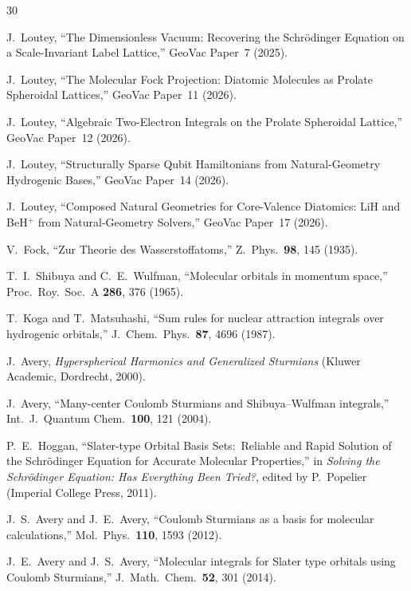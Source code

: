 \documentclass[aps,pra,twocolumn,superscriptaddress,longbibliography]{revtex4-2}
\begin{document}
\begin{thebibliography}{30}

J.~Loutey, ``The Dimensionless Vacuum: Recovering the Schr\"odinger
  Equation on a Scale-Invariant Label Lattice,'' GeoVac Paper~7 (2025).

J.~Loutey, ``The Molecular Fock Projection: Diatomic Molecules as
  Prolate Spheroidal Lattices,'' GeoVac Paper~11 (2026).

J.~Loutey, ``Algebraic Two-Electron Integrals on the Prolate
  Spheroidal Lattice,'' GeoVac Paper~12 (2026).

J.~Loutey, ``Structurally Sparse Qubit Hamiltonians from Natural-Geometry
  Hydrogenic Bases,'' GeoVac Paper~14 (2026).

J.~Loutey, ``Composed Natural Geometries for Core-Valence Diatomics:
  LiH and BeH$^+$ from Natural-Geometry Solvers,'' GeoVac Paper~17 (2026).

V.~Fock, ``Zur Theorie des Wasserstoffatoms,''
  Z.~Phys.\ \textbf{98}, 145 (1935).

T.~I.~Shibuya and C.~E.~Wulfman, ``Molecular orbitals in momentum
  space,'' Proc.\ Roy.\ Soc.\ A \textbf{286}, 376 (1965).

T.~Koga and T.~Matsuhashi, ``Sum rules for nuclear attraction
  integrals over hydrogenic orbitals,''
  J.~Chem.\ Phys.\ \textbf{87}, 4696 (1987).

J.~Avery, \emph{Hyperspherical Harmonics and Generalized Sturmians}
  (Kluwer Academic, Dordrecht, 2000).

J.~Avery, ``Many-center Coulomb Sturmians and Shibuya--Wulfman
  integrals,'' Int.\ J.\ Quantum Chem.\ \textbf{100}, 121 (2004).

P.~E.~Hoggan, ``Slater-type Orbital Basis Sets:\ Reliable and Rapid
  Solution of the Schr\"odinger Equation for Accurate Molecular
  Properties,'' in \emph{Solving the Schr\"odinger Equation: Has
  Everything Been Tried?}, edited by P.~Popelier (Imperial College
  Press, 2011).

J.~S.~Avery and J.~E.~Avery, ``Coulomb Sturmians as a basis for
  molecular calculations,'' Mol.\ Phys.\ \textbf{110}, 1593 (2012).

J.~E.~Avery and J.~S.~Avery, ``Molecular integrals for Slater type
  orbitals using Coulomb Sturmians,''
  J.~Math.\ Chem.\ \textbf{52}, 301 (2014).


\end{thebibliography}
\end{document}
